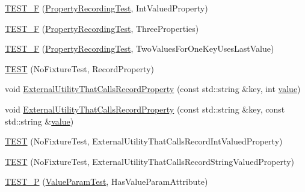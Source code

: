 \begin{DoxyCompactItemize}
\item 
\mbox{\hyperlink{googletest-master_2googletest_2test_2gtest__xml__output__unittest___8cc_adb1f852fc00cf0ee498bdfeda3063904}{T\+E\+S\+T\+\_\+F}} (\mbox{\hyperlink{class_property_recording_test}{Property\+Recording\+Test}}, Int\+Valued\+Property)
\item 
\mbox{\hyperlink{googletest-master_2googletest_2test_2gtest__xml__output__unittest___8cc_ae2e5aa08a79eb9b086a145cc06accfc5}{T\+E\+S\+T\+\_\+F}} (\mbox{\hyperlink{class_property_recording_test}{Property\+Recording\+Test}}, Three\+Properties)
\item 
\mbox{\hyperlink{googletest-master_2googletest_2test_2gtest__xml__output__unittest___8cc_a261de6777fb791a7556366e938ddb98a}{T\+E\+S\+T\+\_\+F}} (\mbox{\hyperlink{class_property_recording_test}{Property\+Recording\+Test}}, Two\+Values\+For\+One\+Key\+Uses\+Last\+Value)
\item 
\mbox{\hyperlink{googletest-master_2googletest_2test_2gtest__xml__output__unittest___8cc_ab78e993a01acfc3e6b0b879351a1e679}{T\+E\+ST}} (No\+Fixture\+Test, Record\+Property)
\item 
void \mbox{\hyperlink{googletest-master_2googletest_2test_2gtest__xml__output__unittest___8cc_a8a5eb3769c1d7482bf69f3a03862c6a6}{External\+Utility\+That\+Calls\+Record\+Property}} (const std\+::string \&key, int \mbox{\hyperlink{_obj__test_2lib_2googletest-master_2googlemock_2test_2gmock-matchers__test_8cc_a337b8a670efc0b086ad3af163f3121b6}{value}})
\item 
void \mbox{\hyperlink{googletest-master_2googletest_2test_2gtest__xml__output__unittest___8cc_a88d769551f5ca79a6668f6ef64a1abdd}{External\+Utility\+That\+Calls\+Record\+Property}} (const std\+::string \&key, const std\+::string \&\mbox{\hyperlink{_obj__test_2lib_2googletest-master_2googlemock_2test_2gmock-matchers__test_8cc_a337b8a670efc0b086ad3af163f3121b6}{value}})
\item 
\mbox{\hyperlink{googletest-master_2googletest_2test_2gtest__xml__output__unittest___8cc_abe7f5c93beecd6501a7b6ccf838f5b10}{T\+E\+ST}} (No\+Fixture\+Test, External\+Utility\+That\+Calls\+Record\+Int\+Valued\+Property)
\item 
\mbox{\hyperlink{googletest-master_2googletest_2test_2gtest__xml__output__unittest___8cc_aabb1993df586239008c66c29009a8b72}{T\+E\+ST}} (No\+Fixture\+Test, External\+Utility\+That\+Calls\+Record\+String\+Valued\+Property)
\item 
\mbox{\hyperlink{googletest-master_2googletest_2test_2gtest__xml__output__unittest___8cc_a615039c123426f44437f6119fce3333f}{T\+E\+S\+T\+\_\+P}} (\mbox{\hyperlink{class_value_param_test}{Value\+Param\+Test}}, Has\+Value\+Param\+Attribute)

\end{DoxyCompactItemize}
